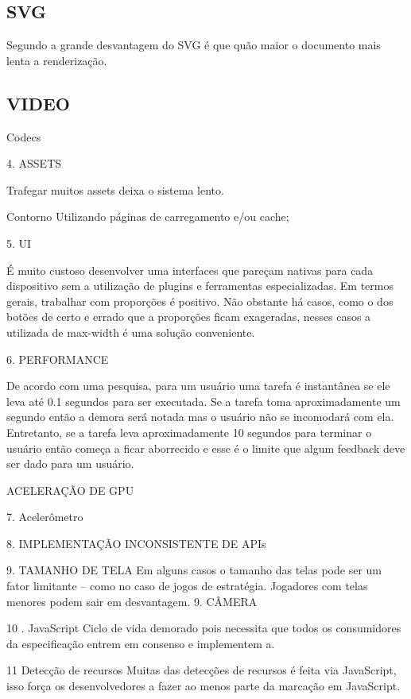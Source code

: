 \documentclass[
12pt,
a4paper,
portuges,
draft
]{report}
\begin{document}
\subsection{SVG}

Segundo \cite{html5mostwanted} a grande desvantagem do SVG é que quão maior o documento mais lenta a renderização.

\subsection{VIDEO}


Codecs

4. ASSETS

Trafegar muitos assets deixa o sistema lento.

 Contorno
Utilizando páginas de carregamento e/ou cache;

5. UI

É muito custoso desenvolver uma interfaces que pareçam nativas
para cada dispositivo sem a utilização de plugins e ferramentas
especializadas. Em termos gerais, trabalhar com proporções é
positivo. Não obstante
há casos, como o dos botões de certo e errado que a proporções ficam
exageradas, nesses casos a utilizada de max-width é uma solução
conveniente.

6. PERFORMANCE

De acordo com uma pesquisa, para um usuário uma tarefa é instantânea
se ele leva até 0.1 segundos para ser executada. Se a tarefa toma
aproximadamente um segundo então a demora será notada mas o
usuário não se incomodará com ela. Entretanto, se a tarefa leva
aproximadamente 10 segundos para terminar o usuário então começa a
ficar aborrecido e esse é o limite que algum feedback deve ser dado
para um usuário.

ACELERAÇÃO DE GPU

7. Acelerômetro

8. IMPLEMENTAÇÃO INCONSISTENTE DE APIs

9.  TAMANHO DE TELA
Em alguns casos o tamanho das telas pode ser um fator limitante – como
no caso de jogos de estratégia. Jogadores com telas menores podem sair
em desvantagem. 9. CÂMERA

10 . JavaScript
Ciclo de vida demorado pois necessita que todos os consumidores da
especificação entrem em consenso e implementem a.

11  Detecção de recursos
Muitas das detecções de recursos é feita via JavaScript, isso força os desenvolvedores a fazer ao menos parte da marcação em JavaScript\autocite{diveIntohtml}.
\end{document}

